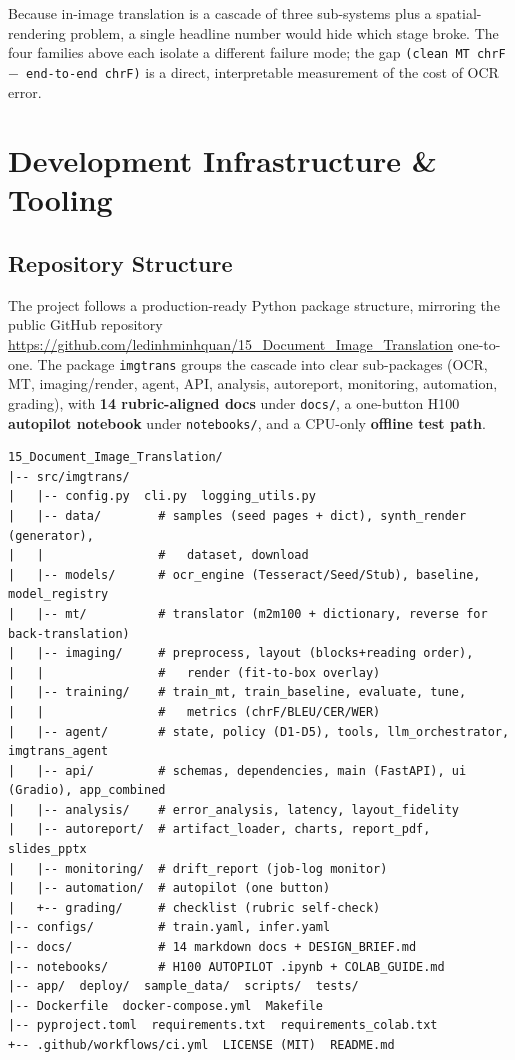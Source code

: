 \documentclass[12pt,a4paper]{article}
\begin{document}
Because in-image translation is a cascade of three sub-systems plus a spatial-rendering problem, a single headline number would hide which stage broke. The four families above each isolate a different failure mode; the gap \texttt{(clean MT chrF $-$ end-to-end chrF)} is a direct, interpretable measurement of the cost of OCR error.

\section{Development Infrastructure \& Tooling}

\subsection{Repository Structure}

The project follows a production-ready Python package structure, mirroring the public GitHub repository \url{https://github.com/ledinhminhquan/15_Document_Image_Translation} one-to-one. The package \texttt{imgtrans} groups the cascade into clear sub-packages (OCR, MT, imaging/render, agent, API, analysis, autoreport, monitoring, automation, grading), with \textbf{14 rubric-aligned docs} under \texttt{docs/}, a one-button H100 \textbf{autopilot notebook} under \texttt{notebooks/}, and a CPU-only \textbf{offline test path}.

\begin{lstlisting}[basicstyle=\ttfamily\footnotesize]
15_Document_Image_Translation/
|-- src/imgtrans/
|   |-- config.py  cli.py  logging_utils.py
|   |-- data/        # samples (seed pages + dict), synth_render (generator),
|   |                #   dataset, download
|   |-- models/      # ocr_engine (Tesseract/Seed/Stub), baseline, model_registry
|   |-- mt/          # translator (m2m100 + dictionary, reverse for back-translation)
|   |-- imaging/     # preprocess, layout (blocks+reading order),
|   |                #   render (fit-to-box overlay)
|   |-- training/    # train_mt, train_baseline, evaluate, tune,
|   |                #   metrics (chrF/BLEU/CER/WER)
|   |-- agent/       # state, policy (D1-D5), tools, llm_orchestrator, imgtrans_agent
|   |-- api/         # schemas, dependencies, main (FastAPI), ui (Gradio), app_combined
|   |-- analysis/    # error_analysis, latency, layout_fidelity
|   |-- autoreport/  # artifact_loader, charts, report_pdf, slides_pptx
|   |-- monitoring/  # drift_report (job-log monitor)
|   |-- automation/  # autopilot (one button)
|   +-- grading/     # checklist (rubric self-check)
|-- configs/         # train.yaml, infer.yaml
|-- docs/            # 14 markdown docs + DESIGN_BRIEF.md
|-- notebooks/       # H100 AUTOPILOT .ipynb + COLAB_GUIDE.md
|-- app/  deploy/  sample_data/  scripts/  tests/
|-- Dockerfile  docker-compose.yml  Makefile
|-- pyproject.toml  requirements.txt  requirements_colab.txt
+-- .github/workflows/ci.yml  LICENSE (MIT)  README.md
\end{lstlisting}
\end{document}
